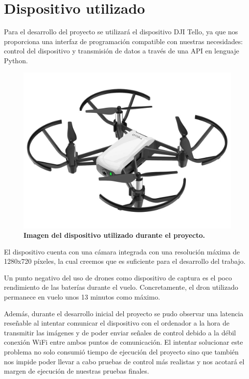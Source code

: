 \section{Dispositivo utilizado}
\label{dispositivo-utilizado}

Para el desarrollo del proyecto se utilizará el dispositivo DJI Tello, ya que nos proporciona una interfaz de programación compatible con nuestras necesidades: control del dispositivo y transmisión de datos a través de una API en lenguaje Python.


\begin{figure}[ht!]
  \centering
  \includegraphics[scale=0.1]{figuras/dispositivo_utilizado.png}
  \caption[DJI Tello. Dispositivo utilizado durante el proyecto]{\textbf{Imagen del dispositivo utilizado durante el proyecto.}}
  \label{fig-dron}
\end{figure}


El dispositivo cuenta con una cámara integrada con una resolución máxima de 1280x720 píxeles, la cual creemos que es suficiente para el desarrollo del trabajo.

Un punto negativo del uso de drones como dispositivo de captura es el poco rendimiento de las baterías durante el vuelo. Concretamente, el dron utilizado permanece en vuelo unos 13 minutos como máximo.

Además, durante el desarrollo inicial del proyecto se pudo observar una latencia reseñable al intentar comunicar el dispositivo con el ordenador a la hora de transmitir las imágenes y de poder enviar señales de control debido a la débil conexión WiFi entre ambos puntos de comunicación. El intentar solucionar este problema no solo consumió tiempo de ejecución del proyecto sino que también nos impide poder llevar a cabo pruebas de control más realistas y nos acotará el margen de ejecución de nuestras pruebas finales.

